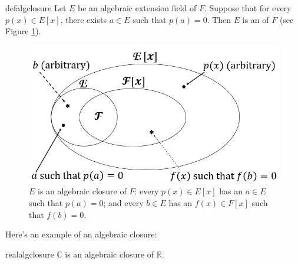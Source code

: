 
\begin{defn}{defalgclosure}  
Let $E$ be an algebraic extension field of $F$. Suppose that for every $p(x) \in E[x]$, there exists $a \in E$ such that $p(a)=0$.  Then  $E$ is  an  of $F$ (see Figure \ref{algebraicclosure}).
\end{defn}

\begin{figure}
\begin{center}
\includegraphics[scale=0.35]{images/algebraic_closure.png}
\caption{$E$ is an algebraic closure of $F$:  every $p(x)\in E[x]$ has an $a\in E$ such that $p(a)=0$; and every $b\in E$ has an $f(x)\in F[x]$ such that $f(b)=0$.}\label{algebraicclosure}
\end{center}
\end{figure}

Here's an example of an algebraic closure:

\begin{prop}{realalgclosure}
$\mathbb{C}$ is an algebraic closure of $\mathbb{R}$.
\end{prop}


